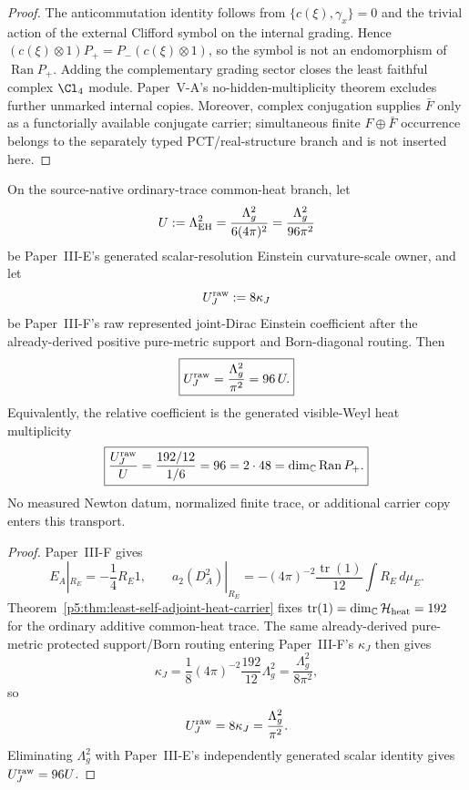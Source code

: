 \documentclass[12pt,a4paper]{article}
\begin{document}
\begin{proof}
The anticommutation identity follows from
$\{c(\xi),\gamma_x\}=0$ and the trivial action of the external Clifford
symbol on the internal grading.  Hence
$(c(\xi)\otimes1)P_+=P_-(c(\xi)\otimes1)$, so the symbol is not an
endomorphism of $\operatorname{Ran}P_+$.  Adding the complementary grading
sector closes the least faithful complex $\Cl_4$ module.  Paper~V-A's
no-hidden-multiplicity theorem excludes further unmarked internal copies.
Moreover, complex conjugation supplies $\bar F$ only as a
functorially available conjugate carrier; simultaneous finite
$F\oplus\bar F$ occurrence belongs to the separately typed
PCT/real-structure branch and is not inserted here.
\end{proof}


\begin{theorem}
\label{p5:thm:g24-raw-eh-transport}
On the source-native ordinary-trace common-heat branch, let
\[
 U:=\Lambda_{\rm EH}^2
 =\frac{\Lambda_g^2}{6(4\pi)^2}
 =\frac{\Lambda_g^2}{96\pi^2}
\]
be Paper~III-E's generated scalar-resolution Einstein curvature-scale owner,
and let
\[
 U_J^{\rm raw}:=8\kappa_J
\]
be Paper~III-F's raw represented joint-Dirac Einstein coefficient after the
already-derived positive pure-metric support and Born-diagonal routing.  Then
\[
 \boxed{
 U_J^{\rm raw}=\frac{\Lambda_g^2}{\pi^2}=96\,U.}
\]
Equivalently, the relative coefficient is the generated visible-Weyl heat
multiplicity
\[
 \boxed{
 \frac{U_J^{\rm raw}}{U}
 =\frac{192/12}{1/6}
 =96
 =2\cdot48
 =\dim_{\mathbb C}\operatorname{Ran}P_+.}
\]
No measured Newton datum, normalized finite trace, or additional carrier copy
enters this transport.
\end{theorem}

\begin{proof}
Paper~III-F gives
\[
 E_A|_{R_E}=-\frac14R_E1,
 \qquad
 a_2(D_A^2)|_{R_E}
 =-(4\pi)^{-2}\frac{\operatorname{tr}(1)}{12}
 \int R_E\,d\mu_E.
\]
Theorem~\ref{p5:thm:least-self-adjoint-heat-carrier} fixes
\(\operatorname{tr}(1)=\dim_{\mathbb C}\mathcal H_{\rm heat}=192\) for the
ordinary additive common-heat trace.  The same already-derived pure-metric
protected support/Born routing entering Paper~III-F's \(\kappa_J\) then gives
\[
 \kappa_J
 =\frac18(4\pi)^{-2}\frac{192}{12}\Lambda_g^2
 =\frac{\Lambda_g^2}{8\pi^2},
\]
so
\[
 U_J^{\rm raw}=8\kappa_J=\frac{\Lambda_g^2}{\pi^2}.
\]
Eliminating \(\Lambda_g^2\) with Paper~III-E's independently generated scalar
identity gives \(U_J^{\rm raw}=96U\).
\end{proof}
\end{document}
